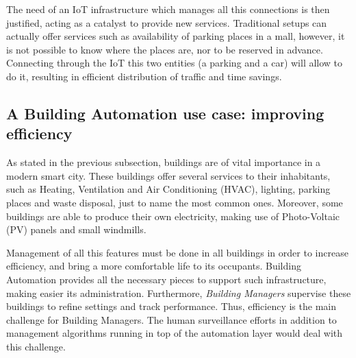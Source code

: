The need of an IoT infrastructure which manages all this connections is then justified, acting as a catalyst to provide new services.
Traditional setups can actually offer services such as availability of parking places in a mall, however, it is not possible to know where the places are, nor to be reserved in advance.
Connecting through the IoT this two entities (a parking and a car) will allow to do it, resulting in efficient distribution of traffic and time savings.

\subsection{A Building Automation use case: improving efficiency}
\label{sec:BAScenario}
As stated in the previous subsection, buildings are of vital importance in a modern smart city.
These buildings offer several services to their inhabitants, such as Heating, Ventilation and Air Conditioning (HVAC), lighting, parking places and waste disposal, just to name the most common ones.
Moreover, some buildings are able to produce their own electricity, making use of Photo-Voltaic (PV) panels and small windmills.

Management of all this features must be done in all buildings in order to increase efficiency, and bring a more comfortable life to its occupants.
Building Automation provides all the necessary pieces to support such infrastructure, making easier its administration.
Furthermore, \textit{Building Managers} supervise these buildings to refine settings and track performance.
Thus, efficiency is the main challenge for Building Managers.
The human surveillance efforts in addition to management algorithms running in top of the automation layer would deal with this challenge.

